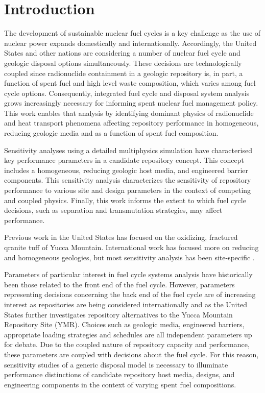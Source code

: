 
\section{Introduction}

The development of sustainable nuclear fuel cycles is a key challenge as the use 
of nuclear power expands domestically and internationally. Accordingly, the 
United States and other nations are considering a number of nuclear fuel cycle 
and geologic disposal options simultaneously. These decisions are 
technologically coupled since radionuclide containment in a geologic 
repository is, in part, a function of spent fuel and high level waste 
composition, which varies among fuel cycle options. Consequently, integrated 
fuel cycle and disposal system analysis grows increasingly necessary for 
informing spent nuclear fuel management policy.  This work enables that analysis 
by identifying dominant physics of radionuclide and heat transport phenomena 
affecting repository performance in homogeneous, reducing geologic media and as 
a function of spent fuel composition. 

Sensitivity analyses using a detailed multiphysics simulation have characterised 
key performance parameters in a candidate repository concept. This concept 
includes a homogeneous, reducing geologic host media, and engineered barrier 
components.  This sensitivity analysis characterizes the sensitivity of 
repository performance to various site and design parameters in the context of 
competing and coupled physics. Finally, this work informs the extent to which 
fuel cycle decisions, such as separation and transmutation strategies, may 
affect performance.

Previous work in the United States has focused on the oxidizing, fractured 
qranite tuff of Yucca Mountain. International work has focused more on reducing 
and homogeneous geologies, but most sensitivity analysis has been site-specific 
\cite{von_lensa_red-impact_2008}.

Parameters of particular interest in fuel cycle systems analysis have 
historically been those related to the front end of the fuel cycle. However, 
parameters representing decisions concerning the back end of the fuel cycle are 
of increasing interest as repositories are being considered internationally and 
as the United States further investigates repository alternatives to the Yucca 
Mountain Repository Site (YMR). Choices such as geologic media, engineered 
barriers, appropriate loading strategies and schedules are all independent 
parameters up for debate. Due to the coupled nature of repository capacity and 
performance, these parameters are coupled with decisions about the fuel cycle.  
For this reason, sensitivity studies of a generic disposal model is necessary to 
illuminate performance distinctions of candidate repository host media, designs, 
and engineering components in the context of varying spent fuel compositions. 
